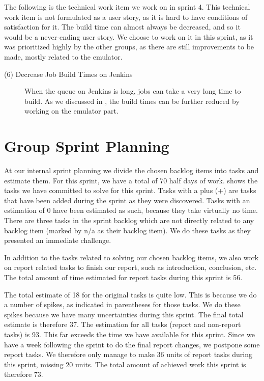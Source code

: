 The following is the technical work item we work on in sprint 4. This technical work item is not formulated as a user story, as it is hard to have conditions of satisfaction for it. The build time can almost always be decreased, and so it would be a never-ending user story. We choose to work on it in this sprint, as it was prioritized highly by the other groups, as there are still improvements to be made, mostly related to the emulator.

\begin{description}
  \item[(6) Decrease Job Build Times on Jenkins] When the queue on Jenkins is long, jobs can take a very long time to build. As we discussed in , the build times can be further reduced by working on the emulator part.
\end{description}

\section{Group Sprint Planning}\label{sec:S4_group}
At our internal sprint planning we divide the chosen backlog items into tasks and estimate them. For this sprint, we have a total of 70 half days of work.  shows the tasks we have committed to solve for this sprint. Tasks with a plus (+) are tasks that have been added during the sprint as they were discovered. Tasks with an estimation of 0 have been estimated as such, because they take virtually no time. There are three tasks in the sprint backlog which are not directly related to any backlog item (marked by n/a as their backlog item). We do these tasks as they presented an immediate challenge.

In addition to the tasks related to solving our chosen backlog items, we also work on report related tasks to finish our report, such as introduction, conclusion, etc. The total amount of time estimated for report tasks during this sprint is 56.

The total estimate of 18 for the original tasks is quite low. This is because we do a number of spikes, as indicated in parentheses for those tasks. We do these spikes because we have many uncertainties during this sprint. The final total estimate is therefore 37. The estimation for all tasks (report and non-report tasks) is 93. This far exceeds the time we have available for this sprint. Since we have a week following the sprint to do the final report changes, we postpone some report tasks. We therefore only manage to make 36 units of report tasks during this sprint, missing 20 units. The total amount of achieved work this sprint is therefore 73.


